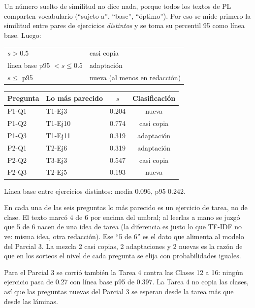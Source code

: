 \documentclass[11pt]{article}
\begin{document}
Un número suelto de similitud no dice nada, porque todos los textos de PL comparten
vocabulario (``sujeto a'', ``base'', ``óptimo''). Por eso se mide primero la similitud entre
pares de ejercicios \emph{distintos} y se toma su percentil 95 como línea base. Luego:

\begin{center}
\begin{tabular}{ll}
\toprule
$s > 0.5$ & casi copia \\
línea base p95 $< s \le 0.5$ & adaptación \\
$s \le$ p95 & nueva (al menos en redacción) \\
\bottomrule
\end{tabular}
\end{center}

\begin{center}
\small
\begin{tabular}{llcc}
\toprule
Pregunta & Lo más parecido & $s$ & Clasificación \\
\midrule
P1-Q1 & T1-Ej3 & 0.204 & nueva \\
P1-Q2 & T1-Ej10 & 0.774 & casi copia \\
P1-Q3 & T1-Ej11 & 0.319 & adaptación \\
P2-Q1 & T2-Ej6 & 0.319 & adaptación \\
P2-Q2 & T3-Ej3 & 0.547 & casi copia \\
P2-Q3 & T2-Ej5 & 0.193 & nueva \\
\bottomrule
\end{tabular}

\smallskip
Línea base entre ejercicios distintos: media 0.096, p95 0.242.
\end{center}

En cada una de las seis preguntas lo más parecido es un ejercicio de tarea, no de clase. El
texto marcó 4 de 6 por encima del umbral; al leerlas a mano se juzgó que 5 de 6 nacen de una
idea de tarea (la diferencia es justo lo que TF-IDF no ve: misma idea, otra redacción). Ese
``5 de 6'' es el dato que alimenta al modelo del Parcial 3. La mezcla 2 casi copias, 2
adaptaciones y 2 nuevas es la razón de que en los sorteos el nivel de cada pregunta se elija
con probabilidades iguales.

Para el Parcial 3 se corrió también la Tarea 4 contra las Clases 12 a 16: ningún ejercicio
pasa de 0.27 con línea base p95 de 0.397. La Tarea 4 no copia las clases, así que las
preguntas nuevas del Parcial 3 se esperan desde la tarea más que desde las láminas.
\end{document}
